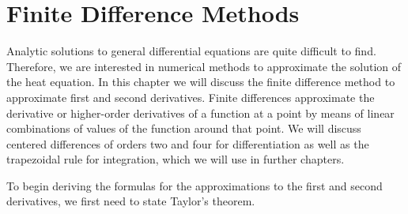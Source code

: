 \documentclass[00main.tex]{subfiles}
\begin{document}
\chapter{Finite Difference Methods}



Analytic solutions to general differential equations are quite difficult to find. Therefore, we are interested in numerical methods to approximate the solution of the heat equation. In this chapter we will discuss the finite difference method to approximate first and second derivatives. Finite differences approximate the derivative or higher-order derivatives of a function at a point by means of linear combinations of values of the function around that point. We will discuss centered differences of orders two and four for differentiation as well as the trapezoidal rule for integration, which we will use in further chapters. 



To begin deriving the formulas for the approximations to the first and second derivatives, we first need to state Taylor's theorem.
\end{document}
